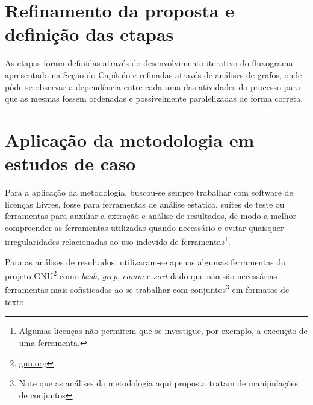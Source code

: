\section{Refinamento da proposta e definição das etapas}

As etapas foram definidas através do desenvolvimento iterativo do fluxograma apresentado na Seção  do Capítulo  e refinadas através de análises de grafos, onde pôde-se observar a dependência entre cada uma das atividades do processo para que as mesmas fossem ordenadas e possivelmente paralelizadas de forma correta.

\section{Aplicação da metodologia em estudos de caso}

Para a aplicação da metodologia, buscou-se sempre trabalhar com software de licenças Livres, fosse para ferramentas de análise estática, suítes de teste ou ferramentas para auxiliar a extração e análise de resultados, de modo a melhor compreender as ferramentas utilizadas quando necessário e evitar quaisquer irregularidades relacionadas ao uso indevido de ferramentas\footnote{Algumas licenças não permitem que se investigue, por exemplo, a execução de uma ferramenta.}.

Para as análises de resultados, utilizaram-se apenas algumas ferramentas do projeto GNU\footnote{\url{gnu.org}} como \textit{bash}, \textit{grep}, \textit{comm} e \textit{sort} dado que não são necessárias ferramentas mais sofisticadas ao se trabalhar com conjuntos\footnote{Note que as análises da metodologia aqui proposta tratam de manipulações de conjuntos} em formatos de texto.

